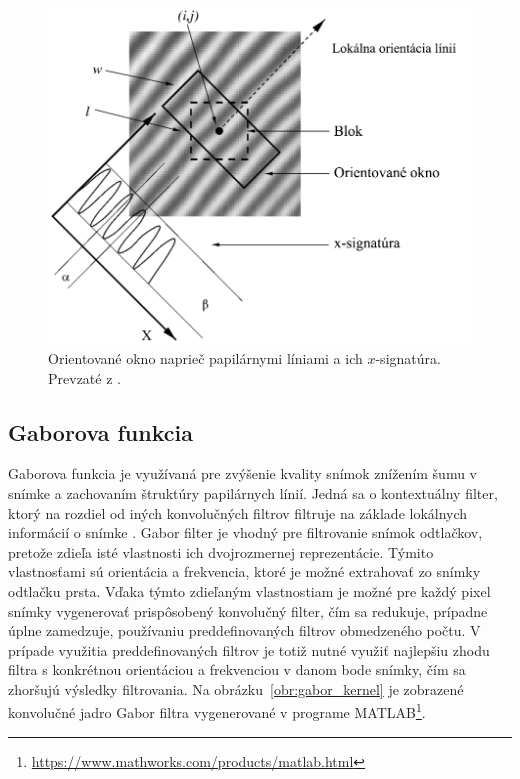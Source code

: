   \begin{figure}[h]
    \centering
    \includegraphics[width=0.7\linewidth]{obrazky-figures/frekvencia-Hong.png}
    \caption{Orientované okno naprieč papilárnymi líniami a ich $x$-signatúra. Prevzaté z \cite{Hong}.}
    \label{obr:frekvencia-Hong}
  \end{figure}

  \subsection{Gaborova funkcia}
  Gaborova funkcia je využívaná pre zvýšenie kvality snímok znížením šumu v snímke a zachovaním štruktúry papilárnych línií. Jedná sa o kontextuálny
  filter, ktorý na rozdiel od iných konvolučných filtrov filtruje na základe lokálnych informácií o snímke \cite{Handbook}. Gabor filter je vhodný
  pre filtrovanie snímok odtlačkov, pretože zdieľa isté vlastnosti ich dvojrozmernej reprezentácie. Týmito vlastnosťami sú orientácia a frekvencia,
  ktoré je možné extrahovať zo snímky odtlačku prsta. Vďaka týmto zdieľaným vlastnostiam je možné pre každý pixel snímky vygenerovať prispôsobený konvolučný
  filter, čím sa redukuje, prípadne úplne zamedzuje, používaniu preddefinovaných filtrov obmedzeného počtu. V prípade využitia preddefinovaných filtrov je totiž
  nutné využiť najlepšiu zhodu filtra s konkrétnou orientáciou a frekvenciou v danom bode snímky, čím sa zhoršujú výsledky filtrovania.
  Na obrázku~{\ref{obr:gabor_kernel}} je zobrazené konvolučné jadro Gabor filtra vygenerované v programe
  \mbox{MATLAB}\footnote{\url{https://www.mathworks.com/products/matlab.html}}.
  
